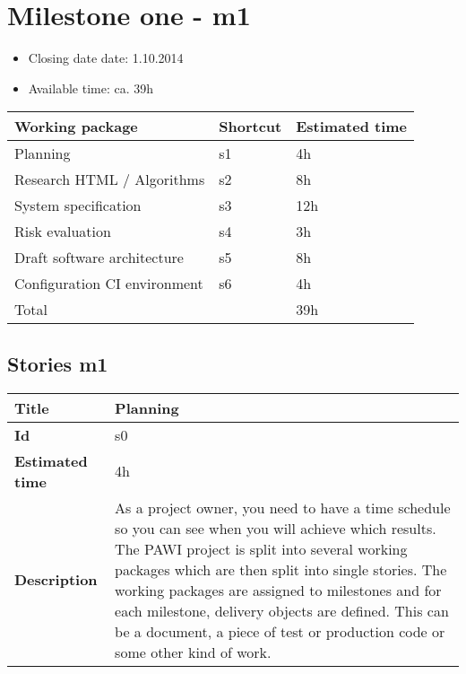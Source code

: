 \section{Milestone one - m1}

\begin{itemize}
\item Closing date date: 1.10.2014
\item Available time: ca. 39h
\end{itemize}

    \begin{tabular}{ | p{10cm} | p{2cm} | p{2cm} |}
    \hline
    \textbf{Working package} & \textbf{Shortcut}& \textbf{Estimated time} \\ \hline
    Planning & s1 &4h \\
    Research HTML / Algorithms & s2 & 8h \\
    System specification & s3 & 12h \\
    Risk evaluation & s4 & 3h\\
    Draft software architecture & s5 & 8h \\ 
    Configuration CI environment & s6 & 4h \\ \hline
    Total & & 39h\\
    \hline
    \end{tabular}

\subsection {Stories m1}

    \begin{tabular}{ | p{4cm} | p{10cm} |}
    \hline
    \textbf{Title} & Planning\\ \hline
    \textbf{Id} & s0\\ \hline
    \textbf{Estimated time} & 4h \\ \hline
    \textbf{Description} &  As a project owner, you need to have a time schedule so you can see when you will achieve which results. The PAWI project is split into several working packages which are then split into single stories. The working packages are assigned to milestones and for each milestone, delivery objects are defined. This can be a document, a piece of test or production code or some other kind of work.\\
    \hline
    \end{tabular} \\\\

